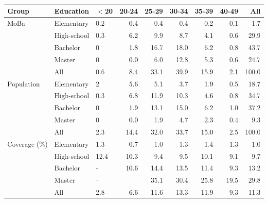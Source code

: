 \centering
\begin{tabular}{lllrrrrrr}
  \hline
Group & Education & $<$20 & 20-24 & 25-29 & 30-34 & 35-39 & 40-49 & All \\ 
  \hline
MoBa & Elementary & 0.2 & 0.4 & 0.4 & 0.4 & 0.2 & 0.1 & 1.7 \\ 
   & High-school & 0.3 & 6.2 & 9.9 & 8.7 & 4.1 & 0.6 & 29.9 \\ 
   & Bachelor & 0 & 1.8 & 16.7 & 18.0 & 6.2 & 0.8 & 43.7 \\ 
   & Master & 0 & 0.0 & 6.0 & 12.8 & 5.3 & 0.6 & 24.7 \\ 
   & All & 0.6 & 8.4 & 33.1 & 39.9 & 15.9 & 2.1 & 100.0 \\ 
  Population & Elementary & 2 & 5.6 & 5.1 & 3.7 & 1.9 & 0.5 & 18.7 \\ 
   & High-school & 0.3 & 6.8 & 11.9 & 10.3 & 4.6 & 0.8 & 34.7 \\ 
   & Bachelor & 0 & 1.9 & 13.1 & 15.0 & 6.2 & 1.0 & 37.2 \\ 
   & Master & 0 & 0.0 & 1.9 & 4.7 & 2.3 & 0.4 & 9.3 \\ 
   & All & 2.3 & 14.4 & 32.0 & 33.7 & 15.0 & 2.5 & 100.0 \\ 
  Coverage (\%) & Elementary & 1.3 & 0.7 & 1.0 & 1.3 & 1.4 & 1.3 & 1.0 \\ 
   & High-school & 12.4 & 10.3 & 9.4 & 9.5 & 10.1 & 9.1 & 9.7 \\ 
   & Bachelor & - & 10.6 & 14.4 & 13.5 & 11.4 & 9.3 & 13.2 \\ 
   & Master & - &  & 35.1 & 30.4 & 25.8 & 19.5 & 29.8 \\ 
   & All & 2.8 & 6.6 & 11.6 & 13.3 & 11.9 & 9.3 & 11.3 \\ 
   \hline
\end{tabular}
